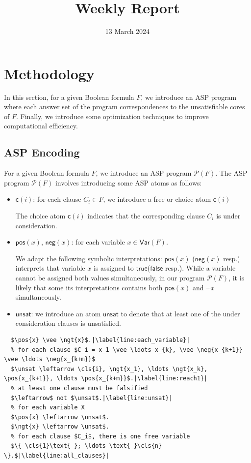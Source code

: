 \documentclass{article}
\title{Weekly Report}
\newcommand{\unsat}{\ensuremath{\mathsf{unsat}}}
\newcommand{\pos}[1]{\ensuremath{\mathsf{pos}(#1)}}
\newcommand{\ngt}[1]{\ensuremath{\mathsf{neg}(#1)}}
\newcommand{\cls}[1]{\ensuremath{\mathsf{c}(#1)}}
\newcommand{\program}[1]{\mathcal{P}(#1)}
\newcommand{\true}{\ensuremath{\mathsf{true}}\xspace}
\newcommand{\false}{\ensuremath{\mathsf{false}}\xspace}
\newcommand{\Var}[1]{\mathsf{Var}(#1)}
\begin{document}
\date{13 March 2024}
\section{Methodology}
In this section, for a given Boolean formula $F$, we introduce an ASP program where each answer set of the program correspondences to the unsatisfiable cores of $F$.
Finally, we introduce some optimization techniques to improve computational efficiency.  
\subsection{ASP Encoding}
For a given Boolean formula $F$, we introduce an ASP program $\program{F}$.
The ASP program $\program{F}$ involves introducing some ASP atoms as follows:
\begin{itemize}
  \item $\cls{i}$: for each clause $C_i \in F$, we introduce a free or choice atom $\cls{i}$
  
  The choice atom $\cls{i}$ indicates that the corresponding clause $C_i$ is under consideration. 
  \item $\pos{x}$, $\ngt{x}$: for each variable $x \in \Var{F}$. 
  
  We adapt the following symbolic interpretations: $\pos{x}$ ($\ngt{x}$ resp.) interprets that variable $x$ is assigned to \true (\false resp.). While 
  a variable cannot be assigned both values simultaneously, in our program $\program{F}$, it is likely that some its interpretations contains both $\pos{x}$ and $\neg{x}$ simultaneously. 
  \item $\unsat$: we introduce an atom $\unsat$ to denote that at least one of the under consideration clauses is unsatisfied.
\end{itemize}
\begin{lstlisting}[caption={Program $\program{F}$},label={code:as_to_uc},captionpos=b,mathescape=true,escapechar=|,float]
  % for each variable $x \in X$
  $\pos{x} \vee \ngt{x}$.|\label{line:each_variable}|
  % for each clause $C_i = x_1 \vee \ldots x_{k}, \vee \neg{x_{k+1}} \vee \ldots \neg{x_{k+m}}$
  $\unsat \leftarrow \cls{i}, \ngt{x_1}, \ldots \ngt{x_k}, \pos{x_{k+1}}, \ldots \pos{x_{k+m}}$.|\label{line:reach1}|
  % at least one clause must be falsified
  $\leftarrow$ not $\unsat$.|\label{line:unsat}|
  % for each variable X
  $\pos{x} \leftarrow \unsat$.
  $\ngt{x} \leftarrow \unsat$.
  % for each clause $C_i$, there is one free variable
  $\{ \cls{1}\text{ }; \ldots \text{ }\cls{n} \}.$|\label{line:all_clauses}|
\end{lstlisting}
\end{document}
